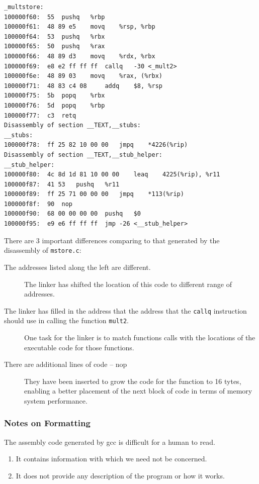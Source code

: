 \documentclass[11pt]{article}
\begin{document}
\begin{verbatim}
_multstore:
100000f60:	55 	pushq	%rbp
100000f61:	48 89 e5 	movq	%rsp, %rbp
100000f64:	53 	pushq	%rbx
100000f65:	50 	pushq	%rax
100000f66:	48 89 d3 	movq	%rdx, %rbx
100000f69:	e8 e2 ff ff ff 	callq	-30 <_mult2>
100000f6e:	48 89 03 	movq	%rax, (%rbx)
100000f71:	48 83 c4 08 	addq	$8, %rsp
100000f75:	5b 	popq	%rbx
100000f76:	5d 	popq	%rbp
100000f77:	c3 	retq
Disassembly of section __TEXT,__stubs:
__stubs:
100000f78:	ff 25 82 10 00 00 	jmpq	*4226(%rip)
Disassembly of section __TEXT,__stub_helper:
__stub_helper:
100000f80:	4c 8d 1d 81 10 00 00 	leaq	4225(%rip), %r11
100000f87:	41 53 	pushq	%r11
100000f89:	ff 25 71 00 00 00 	jmpq	*113(%rip)
100000f8f:	90 	nop
100000f90:	68 00 00 00 00 	pushq	$0
100000f95:	e9 e6 ff ff ff 	jmp	-26 <__stub_helper>
\end{verbatim}


There are 3 important differences comparing to that generated by the disassembly of \texttt{mstore.c}:\\
\begin{description}
\item[{The addresses listed along the left are different.}] The linker has shifted the location of this code to different range of addresses.\\
\item[{The linker has filled in the address that the address that the \texttt{callq} instruction should use in calling the function \texttt{mult2}.}] One task for the linker is to match functions calls with the locations of the executable code for those functions.\\
\item[{There are additional lines of code -- nop}] They have been inserted to grow the code for the function to 16 tytes, enabling a better placement of the next block of code in terms of memory system performance.\\
\end{description}


\subsubsection{Notes on Formatting}
\label{sec:org7d85f65}
The assembly code generated by gcc is difficult for a human to read.\\
\begin{enumerate}
\item It contains information with which we need not be concerned.\\
\item It does not provide any description of the program or how it works.\\
\end{enumerate}
\end{document}
